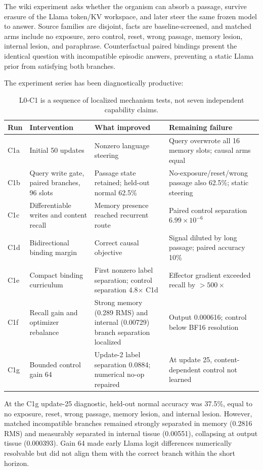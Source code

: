 \documentclass[11pt]{article}
\begin{document}
The wiki experiment asks whether the organism can absorb a passage, survive erasure of
the Llama token/KV workspace, and later steer the same frozen model to answer. Source
families are disjoint, facts are baseline-screened, and matched arms include no exposure,
zero control, reset, wrong passage, memory lesion, internal lesion, and paraphrase.
Counterfactual paired bindings present the identical question with incompatible episodic
answers, preventing a static Llama prior from satisfying both branches.

The experiment series has been diagnostically productive:

\begin{table}[ht]
\centering
\scriptsize
\begin{tabularx}{\textwidth}{p{} p{} p{} X}
\toprule
Run & Intervention & What improved & Remaining failure \\
\midrule
C1a & Initial 50 updates & Nonzero language steering & Query overwrote all 16 memory slots; causal arms equal \\
C1b & Query write gate, paired branches, 96 slots & Passage state retained; held-out normal 62.5\% & No-exposure/reset/wrong passage also 62.5\%; static steering \\
C1c & Differentiable writes and content recall & Memory presence reached recurrent route & Paired control separation $6.99\times10^{-6}$ \\
C1d & Bidirectional binding margin & Correct causal objective & Signal diluted by long passage; paired accuracy 10\% \\
C1e & Compact binding curriculum & First nonzero label separation; control separation 4.8$\times$ C1d & Effector gradient exceeded recall by $>500\times$ \\
C1f & Recall gain and optimizer rebalance & Strong memory (0.289 RMS) and internal (0.00729) branch separation localized & Output 0.000616; control below BF16 resolution \\
C1g & Bounded control gain 64 & Update-2 label separation 0.0884; numerical no-op repaired & At update 25, content-dependent control not learned \\
\bottomrule
\end{tabularx}
\caption{L0-C1 is a sequence of localized mechanism tests, not seven independent
capability claims.}
\label{tab:l0c1}
\end{table}

At the C1g update-25 diagnostic, held-out normal accuracy was 37.5\%, equal to no
exposure, reset, wrong passage, memory lesion, and internal lesion. However, matched
incompatible branches remained strongly separated in memory (0.2816 RMS) and measurably
separated in internal tissue (0.00551), collapsing at output tissue (0.000393). Gain 64
made early Llama logit differences numerically resolvable but did not align them with the
correct branch within the short horizon.
\end{document}
